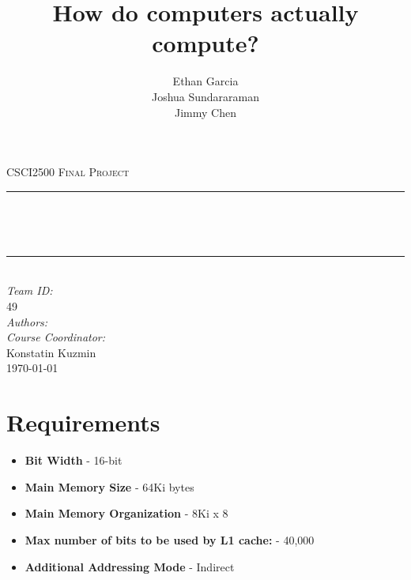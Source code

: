 \documentclass[12pt]{article}
\title{How do computers actually compute?} %
\author{ Ethan Garcia  \\ Joshua Sundararaman  \\   Jimmy Chen \\}
\begin{document}
\begin{titlepage}
    \newcommand{\HRule}{\rule{\linewidth}{0.5mm}} %

    \center
    \textsc{\large CSCI2500 Final Project}\\[1.5cm]

    \makeatletter
    \rule{\linewidth}{0.2 mm} \\[0.4 cm]
    {\huge\bfseries \@title \par} \
    \rule{\linewidth}{0.2 mm} \\[1.0 cm]
    \emph{Team ID:}\\ 49\\[1cm]
    \emph{Authors:}\\
    \@author
    \vspace{1cm}
    \emph{Course Coordinator:}\\
    Konstatin Kuzmin\\
    \vspace{1cm}
    \makeatother
    {\large \today}\\[2cm] %
    \vfill %
\end{titlepage}

\fancyhf{}
\setlength{\headheight}{33pt}
\fancyhead[L]{\nouppercase{\leftmark}}
\fancyfoot[R]{ \bf\thepage\ \rm }

\newpage
\tableofcontents
\newpage
\section{Requirements}
\begin{itemize}
    \item \textbf{Bit Width} - 16-bit
    \item \textbf{Main Memory Size} - 64Ki bytes
    \item \textbf{Main Memory Organization} - 8Ki x 8
    \item \textbf{Max number of bits to be used by L1 cache:} - 40,000
    \item \textbf{Additional Addressing Mode} - Indirect
\end{itemize}
\end{document}
